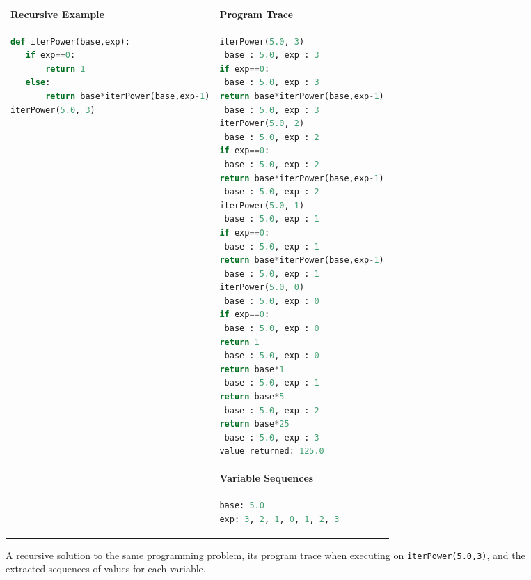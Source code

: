 \begin{figure}
\begin{tabular}{ll}
{\bf Recursive Example} & {\bf Program Trace} \\
\begin{minipage}{0.5\linewidth}
\begin{lstlisting}[basicstyle=\linespread{1.0}\ttfamily\footnotesize,language=python]
def iterPower(base,exp):
   if exp==0:
       return 1
   else:
       return base*iterPower(base,exp-1)
iterPower(5.0, 3)
\end{lstlisting}
\end{minipage} &
\begin{minipage}{0.4\linewidth}
\begin{lstlisting}[basicstyle=\linespread{1.0}\ttfamily\footnotesize,language=python,linebackgroundcolor={\lstcolorlines[gray!20]{2,4,6,8,10,12,14,16,18,20,22,24,26,28,30}}]
iterPower(5.0, 3)
 base : 5.0, exp : 3
if exp==0:
 base : 5.0, exp : 3 
return base*iterPower(base,exp-1)
 base : 5.0, exp : 3 
iterPower(5.0, 2)
 base : 5.0, exp : 2
if exp==0: 
 base : 5.0, exp : 2 
return base*iterPower(base,exp-1)
 base : 5.0, exp : 2
iterPower(5.0, 1)
 base : 5.0, exp : 1
if exp==0:
 base : 5.0, exp : 1
return base*iterPower(base,exp-1)
 base : 5.0, exp : 1
iterPower(5.0, 0)
 base : 5.0, exp : 0
if exp==0:
 base : 5.0, exp : 0
return 1
 base : 5.0, exp : 0
return base*1
 base : 5.0, exp : 1
return base*5
 base : 5.0, exp : 2
return base*25
 base : 5.0, exp : 3
value returned: 125.0
\end{lstlisting}
\end{minipage} 
\\
& {\bf Variable Sequences} \\
&
\begin{minipage}{0.5\linewidth}
\begin{lstlisting}[language=python]
base: 5.0
exp: 3, 2, 1, 0, 1, 2, 3
\end{lstlisting}
\end{minipage}
\end{tabular}
\caption{A recursive solution to the same programming problem, its program trace when executing on \texttt{iterPower(5.0,3)}, and the extracted sequences of values for each variable.}
\label{fig:recursiveTrace}
\end{figure}


